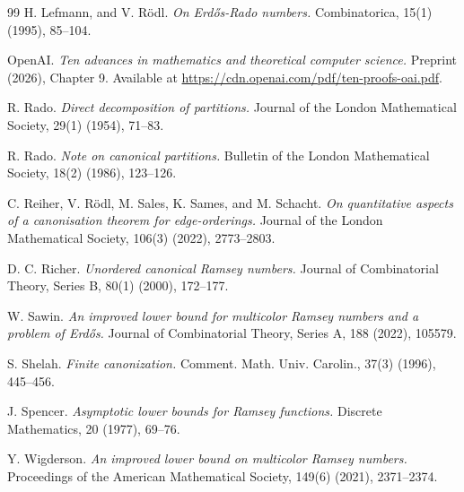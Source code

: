 \documentclass[11pt]{article}
\theoremstyle{plain}
\theoremstyle{definition}
\begin{document}
\begin{thebibliography}{99}
H. Lefmann, and V. R{\"o}dl.
\emph{On Erd\H{o}s-Rado numbers.}
Combinatorica, 15(1) (1995), 85--104.

OpenAI.
\emph{Ten advances in mathematics and theoretical computer science.}
Preprint (2026), Chapter 9. Available at \url{https://cdn.openai.com/pdf/ten-proofs-oai.pdf}.

R. Rado.
\emph{Direct decomposition of partitions.}
Journal of the London Mathematical Society, 29(1) (1954), 71--83.

R. Rado.
\emph{Note on canonical partitions.}
Bulletin of the London Mathematical Society, 18(2) (1986), 123--126.

C. Reiher, V. R{\"o}dl, M. Sales, K. Sames, and M. Schacht.
\emph{On quantitative aspects of a canonisation theorem for edge-orderings.}
Journal of the London Mathematical Society, 106(3) (2022), 2773--2803.

D. C. Richer.
\emph{Unordered canonical Ramsey numbers.}
Journal of Combinatorial Theory, Series B, 80(1) (2000), 172--177.

W. Sawin.
\emph{An improved lower bound for multicolor Ramsey numbers and a problem of Erd\H{o}s.}
Journal of Combinatorial Theory, Series A, 188 (2022), 105579.

S. Shelah.
\emph{Finite canonization.}
Comment. Math. Univ. Carolin., 37(3) (1996), 445--456.

J. Spencer.
\emph{Asymptotic lower bounds for Ramsey functions.}
Discrete Mathematics, 20 (1977), 69--76.

Y. Wigderson.
\emph{An improved lower bound on multicolor Ramsey numbers.}
Proceedings of the American Mathematical Society, 149(6) (2021), 2371--2374.

\end{thebibliography}
\end{document}
